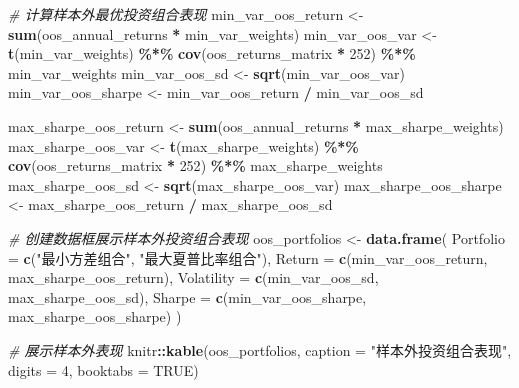 \documentclass[
]{article}
\newenvironment{Shaded}{\begin{snugshade}}{\end{snugshade}}
\newcommand{\AttributeTok}[1]{\textcolor[rgb]{0.13,0.29,0.53}{#1}}
\newcommand{\CommentTok}[1]{\textcolor[rgb]{0.56,0.35,0.01}{\textit{#1}}}
\newcommand{\ConstantTok}[1]{\textcolor[rgb]{0.56,0.35,0.01}{#1}}
\newcommand{\DecValTok}[1]{\textcolor[rgb]{0.00,0.00,0.81}{#1}}
\newcommand{\FunctionTok}[1]{\textcolor[rgb]{0.13,0.29,0.53}{\textbf{#1}}}
\newcommand{\NormalTok}[1]{#1}
\newcommand{\OtherTok}[1]{\textcolor[rgb]{0.56,0.35,0.01}{#1}}
\newcommand{\SpecialCharTok}[1]{\textcolor[rgb]{0.81,0.36,0.00}{\textbf{#1}}}
\newcommand{\StringTok}[1]{\textcolor[rgb]{0.31,0.60,0.02}{#1}}
\begin{document}
\begin{Shaded}
\begin{Highlighting}[]
\CommentTok{\# 计算样本外最优投资组合表现}
\NormalTok{min\_var\_oos\_return }\OtherTok{\textless{}{-}} \FunctionTok{sum}\NormalTok{(oos\_annual\_returns }\SpecialCharTok{*}\NormalTok{ min\_var\_weights)}
\NormalTok{min\_var\_oos\_var }\OtherTok{\textless{}{-}} \FunctionTok{t}\NormalTok{(min\_var\_weights) }\SpecialCharTok{\%*\%} \FunctionTok{cov}\NormalTok{(oos\_returns\_matrix }\SpecialCharTok{*} \DecValTok{252}\NormalTok{) }\SpecialCharTok{\%*\%}\NormalTok{ min\_var\_weights}
\NormalTok{min\_var\_oos\_sd }\OtherTok{\textless{}{-}} \FunctionTok{sqrt}\NormalTok{(min\_var\_oos\_var)}
\NormalTok{min\_var\_oos\_sharpe }\OtherTok{\textless{}{-}}\NormalTok{ min\_var\_oos\_return }\SpecialCharTok{/}\NormalTok{ min\_var\_oos\_sd}

\NormalTok{max\_sharpe\_oos\_return }\OtherTok{\textless{}{-}} \FunctionTok{sum}\NormalTok{(oos\_annual\_returns }\SpecialCharTok{*}\NormalTok{ max\_sharpe\_weights)}
\NormalTok{max\_sharpe\_oos\_var }\OtherTok{\textless{}{-}} \FunctionTok{t}\NormalTok{(max\_sharpe\_weights) }\SpecialCharTok{\%*\%} \FunctionTok{cov}\NormalTok{(oos\_returns\_matrix }\SpecialCharTok{*} \DecValTok{252}\NormalTok{) }\SpecialCharTok{\%*\%}\NormalTok{ max\_sharpe\_weights}
\NormalTok{max\_sharpe\_oos\_sd }\OtherTok{\textless{}{-}} \FunctionTok{sqrt}\NormalTok{(max\_sharpe\_oos\_var)}
\NormalTok{max\_sharpe\_oos\_sharpe }\OtherTok{\textless{}{-}}\NormalTok{ max\_sharpe\_oos\_return }\SpecialCharTok{/}\NormalTok{ max\_sharpe\_oos\_sd}

\CommentTok{\# 创建数据框展示样本外投资组合表现}
\NormalTok{oos\_portfolios }\OtherTok{\textless{}{-}} \FunctionTok{data.frame}\NormalTok{(}
  \AttributeTok{Portfolio =} \FunctionTok{c}\NormalTok{(}\StringTok{"最小方差组合"}\NormalTok{, }\StringTok{"最大夏普比率组合"}\NormalTok{),}
  \AttributeTok{Return =} \FunctionTok{c}\NormalTok{(min\_var\_oos\_return, max\_sharpe\_oos\_return),}
  \AttributeTok{Volatility =} \FunctionTok{c}\NormalTok{(min\_var\_oos\_sd, max\_sharpe\_oos\_sd),}
  \AttributeTok{Sharpe =} \FunctionTok{c}\NormalTok{(min\_var\_oos\_sharpe, max\_sharpe\_oos\_sharpe)}
\NormalTok{)}

\CommentTok{\# 展示样本外表现}
\NormalTok{knitr}\SpecialCharTok{::}\FunctionTok{kable}\NormalTok{(oos\_portfolios, }
             \AttributeTok{caption =} \StringTok{"样本外投资组合表现"}\NormalTok{, }
             \AttributeTok{digits =} \DecValTok{4}\NormalTok{,}
             \AttributeTok{booktabs =} \ConstantTok{TRUE}\NormalTok{)}
\end{Highlighting}
\end{Shaded}
\end{document}
